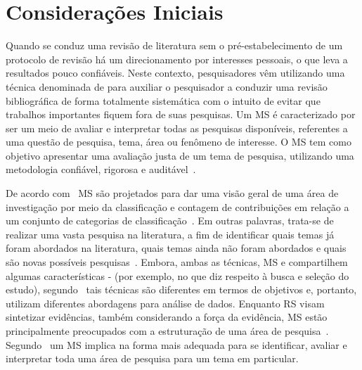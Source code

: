 \section{Considerações Iniciais}

Quando se conduz uma revisão de literatura sem o pré-estabelecimento de um protocolo de revisão há um direcionamento por interesses pessoais, o que leva a resultados pouco confiáveis. Neste contexto, pesquisadores vêm utilizando uma técnica denominada de  para auxiliar o pesquisador a conduzir uma revisão bibliográfica de forma totalmente sistemática com o intuito de evitar que trabalhos importantes fiquem fora de suas pesquisas. Um MS é caracterizado por ser um meio de avaliar e interpretar todas as pesquisas disponíveis, referentes a uma questão de pesquisa, tema, área ou fenômeno de interesse. O MS tem como objetivo apresentar uma avaliação justa de um tema de pesquisa, utilizando uma metodologia confiável, rigorosa e auditável~\cite{Petersen_2008, Kitchenham_2010, Petersen_20151}.


De acordo com~ MS são projetados para dar uma visão geral de uma área de investigação por meio da classificação e contagem de contribuições em relação a um conjunto de categorias de classificação~\cite{Petersen_2008, Kitchenham_2010}. Em outras palavras, trata-se de realizar uma vasta pesquisa na literatura, a fim de identificar quais temas já foram abordados na literatura, quais temas ainda não foram abordados e quais são novas possíveis pesquisas~\cite{Kitchenham_2010}. Embora, ambas as técnicas, MS e  compartilhem algumas características - (por exemplo, no que diz respeito à busca e seleção do estudo), segundo~ tais técnicas são diferentes em termos de objetivos e, portanto, utilizam diferentes abordagens para análise de dados. Enquanto RS visam sintetizar evidências, também considerando a força da evidência, MS estão principalmente preocupados com a estruturação de uma área de pesquisa~\cite{Petersen_20151}. Segundo~ um MS implica na forma mais adequada para se identificar, avaliar e interpretar toda uma área de pesquisa para um tema em particular. 

